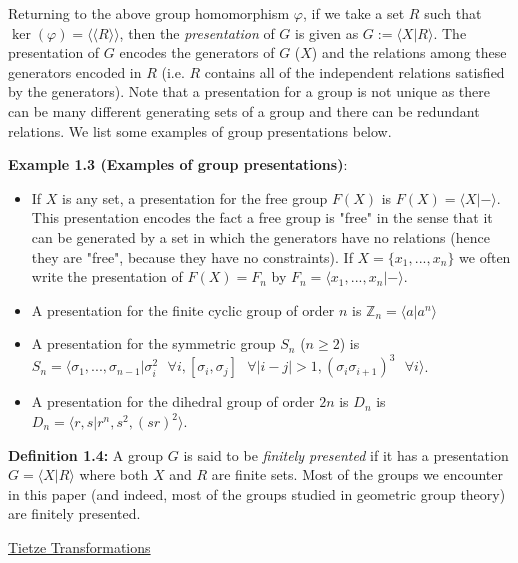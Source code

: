 \documentclass[12pt]{article}
\newcommand{\vs}{\vskip10pt}
\begin{document}
	\vs
	
	Returning to the above group homomorphism $\varphi$, if we take a set $R$ such that $\ker(\varphi) = \langle \langle R \rangle \rangle$, then the \textit{presentation} of $G$ is given as $G := \langle X \vert R \rangle$. The presentation of $G$ encodes the generators of $G$ ($X$) and the relations among these generators encoded in $R$ (i.e. $R$ contains all of the independent relations satisfied by the generators). Note that a presentation for a group is not unique as there can be many different generating sets of a group and there can be redundant relations. We list some examples of group presentations below. 
	
	\vs 
	
	\textbf{Example 1.3 (Examples of group presentations)}: 
	
	\begin{itemize}
		\item If $X$ is any set, a presentation for the free group $F(X)$ is $F(X) = \langle X \vert - \rangle$. This presentation encodes the fact a free group is "free" in the sense that it can be generated by a set in which the generators have no relations (hence they are "free", because they have no constraints). If $X = \{x_1,...,x_n\} $ we often write the presentation of $F(X) = F_n$ by $F_n = \langle x_1,...,x_n \vert - \rangle$. 
		\item A presentation for the finite cyclic group of order $n$ is $\mathbb{Z}_n = \langle a \vert a^n \rangle$
		\item A presentation for the symmetric group $S_n$ ($n \geq 2$) is $S_n = \langle \sigma_1,...,\sigma_{n-1} \vert \sigma_i^2 \text{ } \forall i, [\sigma_i, \sigma_j] \text{ } \forall \vert i - j \vert > 1, (\sigma_i \sigma_{i+1})^3 \text{ } \forall i \rangle$. 
		\item A presentation for the dihedral group of order $2n$ is $D_n$ is $D_n = \langle r,s \vert r^n, s^2, (sr)^2 \rangle$. 
	\end{itemize}

	\textbf{Definition 1.4: } A group $G$ is said to be \textit{finitely presented} if it has a presentation $G = \langle X \vert R \rangle$ where both $X$ and $R$ are finite sets. Most of the groups we encounter in this paper (and indeed, most of the groups studied in geometric group theory) are finitely presented. 
	
	\vs 
	
	\underline{Tietze Transformations}
	
	\vs
	
\end{document}
